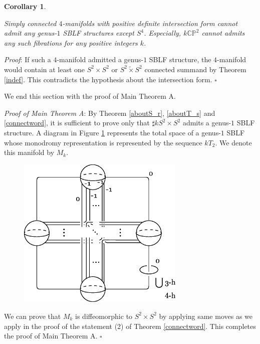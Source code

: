 \documentclass{amsart}
\theoremstyle{plain}
\newtheorem{cor}[thm]{Corollary}
\theoremstyle{definition}
\begin{document}
\begin{cor}\label{definite}

Simply connected $4$-manifolds with positive definite intersection form cannot admit any genus-$1$ SBLF structures except $S^4$. 
Especially, $k\mathbb{CP}^2$ cannot admits any such fibrations for any positive integers $k$. 

\end{cor}

{\it Proof}: If such a $4$-manifold admitted a genus-$1$ SBLF structure, the $4$-manifold would contain at least one $S^2\times S^2$ or $S^2\tilde{\times}S^2$ connected summand by Theorem \ref{indef}. 
This contradicts the hypothesis about the intersection form. \hfill $\square$

We end this section with the proof of Main Theorem A. 
\\[5pt]
\par
{\it Proof of Main Theorem A}: By Theorem \ref{aboutS_r}, \ref{aboutT_s} and \ref{connectword}, it is sufficient to prove only that $\sharp kS^2\times S^2$ admits a genus-$1$ SBLF structure. 
A diagram in Figure \ref{kS^2timesS^2} represents the total space of a genus-$1$ SBLF whose monodromy representation is represented by the sequence $kT_2$. 
We denote this manifold by $M_k$. 

\begin{figure}[htbp]
\begin{center}
\includegraphics[width=80mm]{S2.eps}
\end{center}
\caption{}
\label{kS^2timesS^2}
\end{figure}

We can prove that $M_k$ is diffeomorphic to $S^2\times S^2$ by applying same moves as we apply in the proof of the statement (2) of Theorem \ref{connectword}. 
This completes the proof of Main Theorem A.  \hfill $\square$
\end{document}
